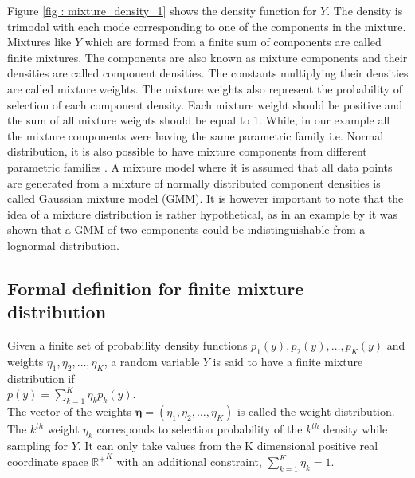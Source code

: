 Figure \ref{fig : mixture_density_1} shows the density function for $Y$. The density is trimodal with each mode corresponding to one of the components in the mixture. Mixtures like $Y$ which are formed from a finite sum of components are called finite mixtures. The components are also known as mixture components and their densities are called component densities. The constants multiplying their densities are called mixture weights. The mixture weights also represent the probability of selection of each component density. Each mixture weight should be positive and the sum of all mixture weights should be equal to 1. While, in our example all the  mixture components were having the same parametric family i.e. Normal distribution, it is also possible to have mixture components from different parametric families \citep[pg. 4]{fruhwirth-schnatter_finite_2013}. A mixture model where it is assumed that all data points are generated from a mixture of normally distributed component densities is called Gaussian mixture model (GMM). It is however important to note that the idea of a mixture distribution is rather hypothetical, as in an example by \citet{titterington_statistical_1986} it was shown that a GMM of two components could be indistinguishable from a lognormal distribution.

\subsection{Formal definition for finite mixture distribution}
\label{subsec : formal_def_mixture_dist}
Given a finite set of probability density functions $p_1(y), p_2(y), \ldots, p_K(y)$ and weights $\eta_1, \eta_2, \ldots, \eta_K$, a random variable $Y$ is said to have a finite mixture distribution if\\

$p(y) = \sum_{k=1}^{K} \eta_{k} p_{k}(y)$.\\

The vector of the weights $\boldsymbol{\eta} = (\eta_1, \eta_2, \ldots, \eta_K)$ is called the weight distribution. The $k^{th}$ weight $\eta_{k}$ corresponds to selection probability of the $k^{th}$ density while sampling for $Y$. It can only take values from the K dimensional positive real coordinate space ${\mathbb{R}^{+}}^K$ with an additional constraint, $\sum_{k=1}^{K} \eta_{k} = 1$.\\

